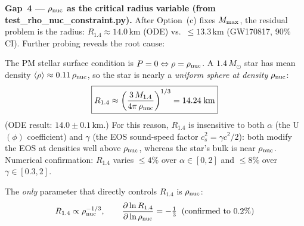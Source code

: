 \documentclass[10pt,twocolumn]{article}
\begin{document}
\textbf{Gap~4 — $\rho_{\rm nuc}$ as the critical radius variable (from test\_rho\_nuc\_constraint.py).}
After Option~(c) fixes $M_{\rm max}$, the residual problem is the radius:
$R_{1.4}\approx 14.0$\,km (ODE) vs.\ $\leq 13.3$\,km (GW170817, 90\% CI).
Further probing reveals the root cause:

The PM stellar surface condition is $P=0 \Leftrightarrow \rho=\rho_{\rm nuc}$.
A $1.4\,M_\odot$ star has mean density $\langle\rho\rangle \approx 0.11\,\rho_{\rm nuc}$,
so the star is nearly a \emph{uniform sphere at density $\rho_{\rm nuc}$}:
\[
  \boxed{R_{1.4} \approx \left(\frac{3\,M_{1.4}}{4\pi\,\rho_{\rm nuc}}\right)^{1/3}
        = 14.24\;\text{km}}
\]
\noindent (ODE result: $14.0\pm 0.1$\,km.)
For this reason, $R_{1.4}$ is insensitive to both $\alpha$ (the U$(\phi)$
coefficient) and $\gamma$ (the EOS sound-speed factor $c_s^2=\gamma c^2/2$):
both modify the EOS at densities well above $\rho_{\rm nuc}$, whereas the
star's bulk is near $\rho_{\rm nuc}$.  Numerical confirmation:
$R_{1.4}$ varies $\leq 4\%$ over $\alpha\in[0,2]$ and $\leq 8\%$ over $\gamma\in[0.3,2]$.

The \emph{only} parameter that directly controls $R_{1.4}$ is $\rho_{\rm nuc}$:
\[
  R_{1.4}\propto \rho_{\rm nuc}^{-1/3},
  \qquad
  \frac{\partial \ln R_{1.4}}{\partial \ln\rho_{\rm nuc}} = -\tfrac{1}{3}
  \;\;\text{(confirmed to 0.2\%)}
\]
\end{document}
